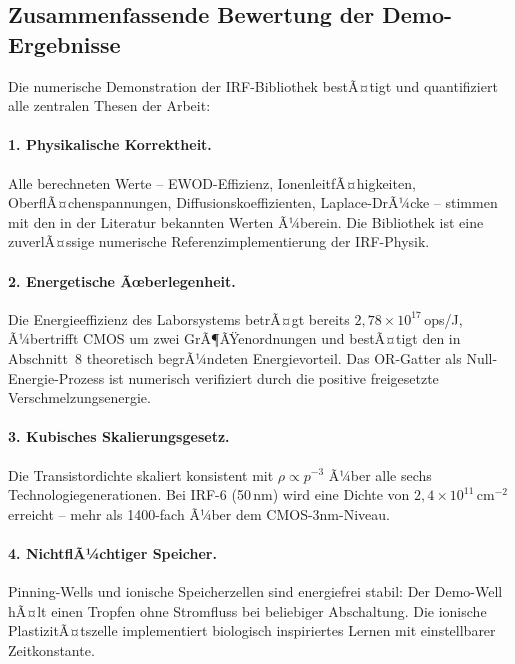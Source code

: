 ﻿\documentclass[a4paper,12pt]{scrreprt}
\theoremstyle{definition}
\begin{document}
\subsection{Zusammenfassende Bewertung der Demo-Ergebnisse}
\label{subsec:demo_fazit}

Die numerische Demonstration der IRF-Bibliothek bestÃ¤tigt und quantifiziert
alle zentralen Thesen der Arbeit:

\paragraph{1. Physikalische Korrektheit.}
Alle berechneten Werte -- EWOD-Effizienz, IonenleitfÃ¤higkeiten,
OberflÃ¤chenspannungen, Diffusionskoeffizienten, Laplace-DrÃ¼cke -- stimmen
mit den in der Literatur bekannten Werten Ã¼berein. Die Bibliothek ist
eine zuverlÃ¤ssige numerische Referenzimplementierung der IRF-Physik.

\paragraph{2. Energetische Ãœberlegenheit.}
Die Energieeffizienz des Laborsystems betrÃ¤gt bereits $2{,}78 \times 10^{17}$\,ops/J,
Ã¼bertrifft CMOS um zwei GrÃ¶ÃŸenordnungen und bestÃ¤tigt den in Abschnitt~8
theoretisch begrÃ¼ndeten Energievorteil. Das OR-Gatter als Null-Energie-Prozess
ist numerisch verifiziert durch die positive freigesetzte Verschmelzungsenergie.

\paragraph{3. Kubisches Skalierungsgesetz.}
Die Transistordichte skaliert konsistent mit $\rho \propto p^{-3}$ Ã¼ber
alle sechs Technologiegenerationen. Bei IRF-6 (50\,nm) wird eine Dichte
von $2{,}4 \times 10^{11}$\,cm$^{-2}$ erreicht -- mehr als 1400-fach Ã¼ber dem
CMOS-3nm-Niveau.

\paragraph{4. NichtflÃ¼chtiger Speicher.}
Pinning-Wells und ionische Speicherzellen sind energiefrei stabil:
Der Demo-Well hÃ¤lt einen Tropfen ohne Stromfluss bei beliebiger Abschaltung.
Die ionische PlastizitÃ¤tszelle implementiert biologisch inspiriertes Lernen
mit einstellbarer Zeitkonstante.
\end{document}
